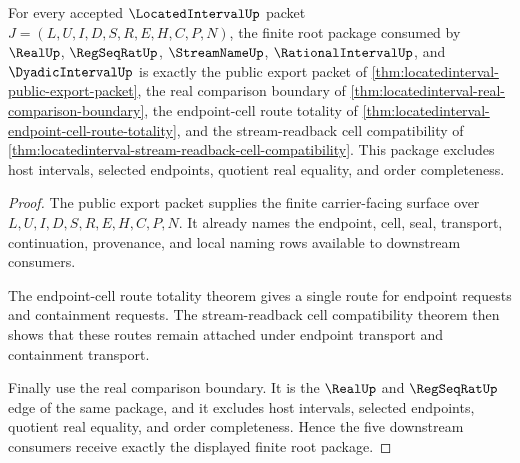 \begin{theorem}
\label{thm:locatedinterval-downstream-root-unblock-package}
For every accepted $\LocatedIntervalUp$ packet $J=(L,U,I,D,S,R,E,H,C,P,N)$, the finite root package consumed by $\RealUp$, $\RegSeqRatUp$, $\StreamNameUp$, $\RationalIntervalUp$, and $\DyadicIntervalUp$ is exactly the public export packet of \autoref{thm:locatedinterval-public-export-packet}, the real comparison boundary of \autoref{thm:locatedinterval-real-comparison-boundary}, the endpoint-cell route totality of \autoref{thm:locatedinterval-endpoint-cell-route-totality}, and the stream-readback cell compatibility of \autoref{thm:locatedinterval-stream-readback-cell-compatibility}. This package excludes host intervals, selected endpoints, quotient real equality, and order completeness.
\end{theorem}
\begin{proof}
The public export packet supplies the finite carrier-facing surface over $L,U,I,D,S,R,E,H,C,P,N$. It already names the endpoint, cell, seal, transport, continuation, provenance, and local naming rows available to downstream consumers.

The endpoint-cell route totality theorem gives a single route for endpoint requests and containment requests. The stream-readback cell compatibility theorem then shows that these routes remain attached under endpoint transport and containment transport.

Finally use the real comparison boundary. It is the $\RealUp$ and $\RegSeqRatUp$ edge of the same package, and it excludes host intervals, selected endpoints, quotient real equality, and order completeness. Hence the five downstream consumers receive exactly the displayed finite root package.
\end{proof}

